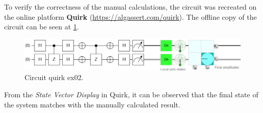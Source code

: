 To verify the correctness of the manual calculations, the circuit was recreated on the online platform \textbf{Quirk} (\url{https://algassert.com/quirk}).
The offline copy of the circuit can be seen at \cref{fig:quirk1}.
\begin{figure}[H]
\centering
\includegraphics[width=0.9\linewidth]{circuits/Quirk_1.png}
\caption{Circuit quirk ex02.}
\label{fig:quirk1}
\end{figure}

From the \textit{State Vector Display} in Quirk, it can be observed that the final state of the system matches with the manually calculated result.
